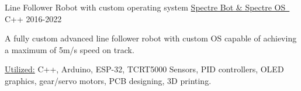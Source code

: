 \begin{cventries}
      \cventryprojects
      {Line Follower Robot with custom operating system} %
      {\href{https://www.hamidurrk.com/projects?project=spectre-bot-os}{Spectre Bot \& Spectre OS\ {\mdseries\faExternalLink}}} %
      {C++} %
      {2016-2022} %
      {
        \begin{cvitems} %
          \item {A fully custom advanced line follower robot with custom OS capable of achieving a maximum of 5m/s speed on track.}
          \item {\underline{Utilized:} C++, Arduino, ESP-32, TCRT5000 Sensors, PID controllers, OLED graphics, gear/servo motors, PCB designing, 3D printing.}
        \end{cvitems}
      }
\end{cventries}

